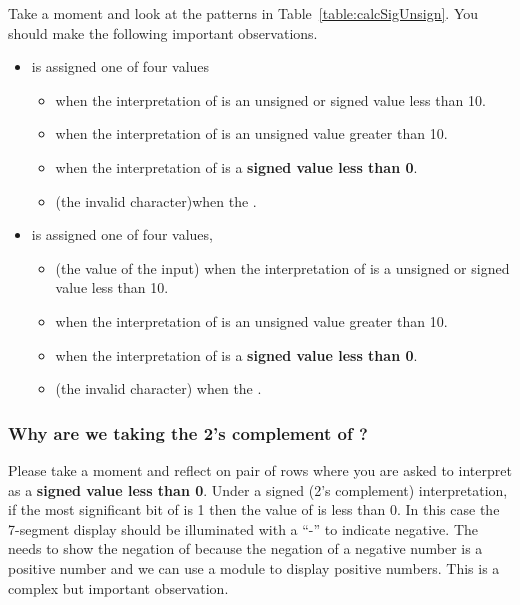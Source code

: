     Take a moment and look at the patterns in Table~\ref{table:calcSigUnsign}.  You should make the
    following important observations.
    \begin{itemize}

        \item {} is assigned one of four values
            \begin{itemize}
                \item  {} when the interpretation of  is an unsigned or signed value less than  10.
                \item {} when the interpretation of  is an unsigned value greater than 10.
                \item \hdl{-} when the interpretation of  is a \textbf{signed value less than 0}.
                \item {} (the invalid character)when the .
            \end{itemize}

        \item {} is assigned one of four values,
            \begin{itemize}
                \item {} (the value of the  input) when the interpretation of  is a
                    unsigned or signed value less than 10.
                \item {} when the interpretation of  is an unsigned value greater than 10.
                \item {} when the interpretation of  is a \textbf{signed value less than 0}.
                \item {} (the invalid character) when the .
            \end{itemize}
    \end{itemize}

    \subsubsection{Why are we taking the 2's complement of ?}

    Please take a moment and reflect on pair of rows where you are asked to interpret  as a
    \textbf{signed value less than 0}.
    Under a signed (2's complement) interpretation, if the most significant bit of  is 1 then the
    value of  is less than 0.
    In this case the   7-segment display should be illuminated with a ``-'' to indicate
    negative.  The  needs
    to show the negation of  because the negation of a negative number is a positive number and we can
    use a 
    module to display positive numbers.  This is a complex but important observation.

